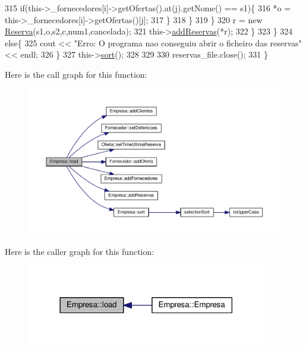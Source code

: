 \begin{DoxyCode}
315                                 \textcolor{keywordflow}{if}(this->\_fornecedores[i]->getOfertas().at(j).getNome() == s1)\{
316                                     *o = this->\_fornecedores[i]->getOfertas()[j];
317                                 \}
318                             \}
319                         \}
320             r = \textcolor{keyword}{new} \hyperlink{classReserva}{Reserva}(s1,o,s2,c,num1,cancelada);
321             this->\hyperlink{classEmpresa_a42a1671b234ab8380cfb2ed33517edb2}{addReservas}(*r);
322         \}
323     \}
324     \textcolor{keywordflow}{else}\{
325         cout << \textcolor{stringliteral}{"Erro: O programa nao conseguiu abrir o ficheiro das reservas"} << endl;
326     \}
327     this->\hyperlink{classEmpresa_aa7424cde3bdf1b1921967bc176d0ab50}{sort}();
328 
329 
330     reservas\_file.close();
331 \}
\end{DoxyCode}


Here is the call graph for this function\+:
\nopagebreak
\begin{figure}[H]
\begin{center}
\leavevmode
\includegraphics[width=350pt]{classEmpresa_a3445c3c507b4f45d1d7831908ff4cdf1_cgraph}
\end{center}
\end{figure}




Here is the caller graph for this function\+:
\nopagebreak
\begin{figure}[H]
\begin{center}
\leavevmode
\includegraphics[width=297pt]{classEmpresa_a3445c3c507b4f45d1d7831908ff4cdf1_icgraph}
\end{center}
\end{figure}


